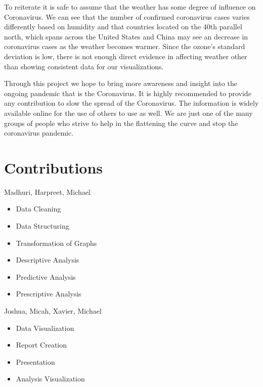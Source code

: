 \documentclass[10pt,journal,compsoc]{IEEEtran}
\begin{document}
{{{	To reiterate it is safe to assume that the weather has some degree of influence on Coronavirus. We can see that the number of confirmed coronavirus cases varies differently based on humidity and that countries located on the 40th parallel north, which spans across the United States and China may see an decrease in coronavirus cases as the weather becomes warmer. Since the ozone’s standard deviation is low, there is not enough direct evidence in affecting weather other than showing consistent data for our visualizations.

	Through this project we hope to bring more awareness and insight into the ongoing pandemic that is the Coronavirus. It is highly recommended to provide any contribution to slow the spread of the Coronavirus. The information is widely available online for the use of others to use as well. We are just one of the many groups of people who strive to help in the flattening the curve and stop the coronavirus pandemic.

\ifCLASSOPTIONcompsoc
\section*{Contributions}
Madhuri, Harpreet, Michael 
\begin{itemize}
	\item Data Cleaning  
	
	\item Data Structuring

	\item Transformation of Graphs

	\item Descriptive Analysis

	\item Predictive Analysis

	\item Prescriptive Analysis
\end{itemize}
Joshua, Micah, Xavier, Michael
\begin{itemize}
	\item Data Visualization
	
	\item Report Creation
	
	\item Presentation

	\item Analysis Visualization 
\end{itemize}
\ifCLASSOPTIONcompsoc
}}}
\end{document}
